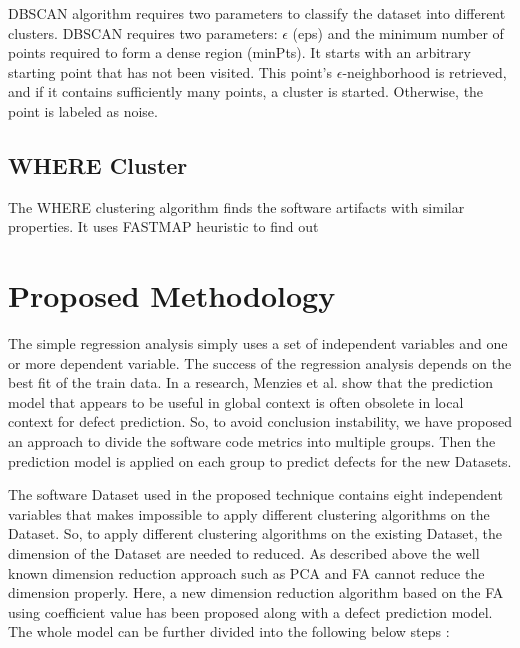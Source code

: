 \documentclass[12pt]{report}
\begin{document}
DBSCAN algorithm requires two parameters to classify the dataset into different clusters. DBSCAN requires two parameters: $\epsilon$ (eps) and the minimum number of points required to form a dense region (minPts). It starts with an arbitrary starting point that has not been visited. This point's $\epsilon$-neighborhood is retrieved, and if it contains sufficiently many points, a cluster is started. Otherwise, the point is labeled as noise. 


\subsection{WHERE Cluster}

The WHERE clustering algorithm finds the software artifacts with similar properties. It uses FASTMAP heuristic to find out 

\section{Proposed Methodology}


The simple regression analysis simply uses a set of independent variables and one or more dependent variable.  The success of the regression analysis depends on the best fit of the train data. In a research, Menzies et al. show that the prediction model that appears to be useful in global context is often obsolete in local context for defect prediction. So, to avoid conclusion instability, we have proposed an approach to divide the software code metrics into multiple groups. Then the prediction model is applied on each group to predict defects for the new Datasets.  

The software Dataset used in the proposed technique contains eight independent variables that makes impossible to apply different clustering algorithms on the Dataset. So, to apply different clustering algorithms on the existing Dataset, the dimension of the Dataset are needed to reduced. As described above the well known dimension reduction approach such as PCA and FA cannot reduce the dimension properly. Here, a new dimension reduction algorithm based on the FA using coefficient value has been proposed along with a defect prediction model. The whole model can be further divided into the following below steps : 
\end{document}
